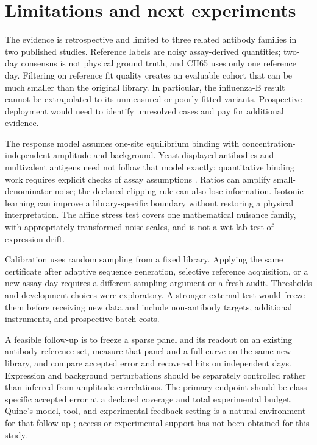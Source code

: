 \documentclass[11pt,letterpaper]{article}
\begin{document}
\section{Limitations and next experiments}
The evidence is retrospective and limited to three related antibody families in two published studies. Reference labels are noisy assay-derived quantities; two-day consensus is not physical ground truth, and CH65 uses only one reference day. Filtering on reference fit quality creates an evaluable cohort that can be much smaller than the original library. In particular, the influenza-B result cannot be extrapolated to its unmeasured or poorly fitted variants. Prospective deployment would need to identify unresolved cases and pay for additional evidence.

The response model assumes one-site equilibrium binding with concentration-independent amplitude and background. Yeast-displayed antibodies and multivalent antigens need not follow that model exactly; quantitative binding work requires explicit checks of assay assumptions \citep{jarmoskaite2020}. Ratios can amplify small-denominator noise; the declared clipping rule can also lose information. Isotonic learning can improve a library-specific boundary without restoring a physical interpretation. The affine stress test covers one mathematical nuisance family, with appropriately transformed noise scales, and is not a wet-lab test of expression drift.

Calibration uses random sampling from a fixed library. Applying the same certificate after adaptive sequence generation, selective reference acquisition, or a new assay day requires a different sampling argument or a fresh audit. Thresholds and development choices were exploratory. A stronger external test would freeze them before receiving new data and include non-antibody targets, additional instruments, and prospective batch costs.

A feasible follow-up is to freeze a sparse panel and its readout on an existing antibody reference set, measure that panel and a full curve on the same new library, and compare accepted error and recovered hits on independent days. Expression and background perturbations should be separately controlled rather than inferred from amplitude correlations. The primary endpoint should be class-specific accepted error at a declared coverage and total experimental budget. Quine's model, tool, and experimental-feedback setting is a natural environment for that follow-up \citep{quine}; access or experimental support has not been obtained for this study.
\end{document}
